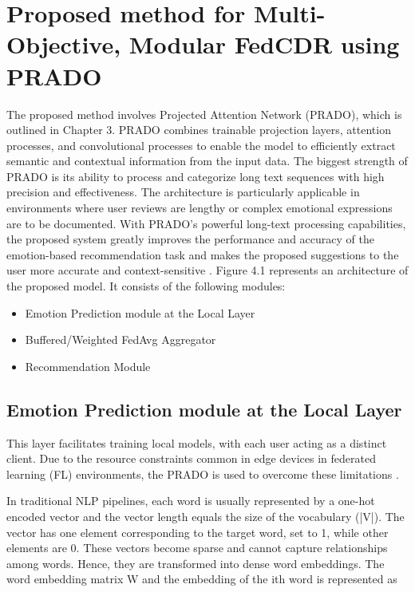 \section{Proposed method for Multi-Objective, Modular FedCDR using PRADO}
The proposed method involves Projected Attention Network (PRADO), which is outlined in Chapter 3. PRADO combines trainable projection layers, attention processes, and convolutional processes to enable the model to efficiently extract semantic and contextual information from the input data. The biggest strength of PRADO is its ability to process and categorize long text sequences with high precision and effectiveness. The architecture is particularly applicable in environments where user reviews are lengthy or complex emotional expressions are to be documented. With PRADO's powerful long-text processing capabilities, the proposed system greatly improves the performance and accuracy of the emotion-based recommendation task and makes the proposed suggestions to the user more accurate and context-sensitive \cite{ref37}. Figure 4.1 represents an architecture of the proposed model. It consists of the following modules:

\begin{itemize}
    \item Emotion Prediction module at the Local Layer
    \item Buffered/Weighted FedAvg Aggregator
    \item Recommendation Module
\end{itemize}

\subsection{Emotion Prediction module at the Local Layer}
This layer facilitates training local models, with each user acting as a distinct client. Due to the resource constraints common in edge devices in federated learning (FL) environments, the PRADO is used to overcome these limitations \cite{ref75}.

In traditional NLP pipelines, each word is usually represented by a one-hot encoded vector and the vector length equals the size of the vocabulary (|V|). The vector has one element corresponding to the target word, set to 1, while other elements are 0. These vectors become sparse and cannot capture relationships among words. Hence, they are transformed into dense word embeddings. The word embedding matrix W and the embedding of the ith word is represented as

